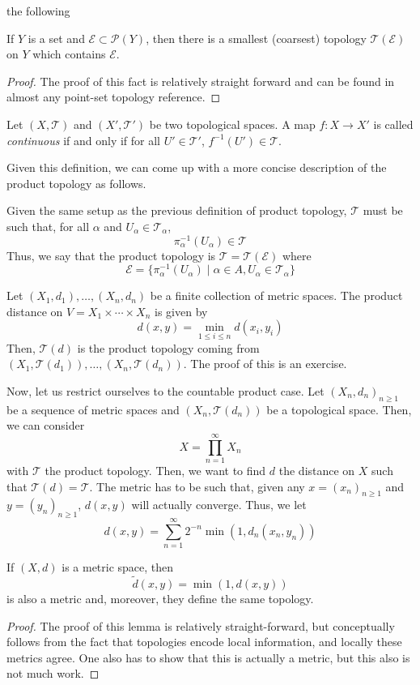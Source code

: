 \documentclass[11pt,leqno,oneside]{amsbook}
\numberwithin{thm}{section}
\renewcommand{\P}{\mathcal{P}}
\newcommand{\Ep}{\mathcal{E}}
\newcommand{\Top}{\mathcal{T}} %
\begin{document}
the following
\begin{prop}
  If $Y$ is a set and $\Ep \subset \P(Y)$, then there is a smallest (coarsest)
topology $\Top(\Ep)$ on $Y$ which contains $\Ep$.
\end{prop}
\begin{proof}
  The proof of this fact is relatively straight forward and can be
  found in almost any point-set topology reference.
\end{proof}
\begin{defn}
  Let $(X,\Top)$ and $(X',\Top')$ be two topological spaces. A map $f\colon
  X \to X'$ is called \emph{continuous} if and only if for all $U' \in
  \Top'$, $f^{-1}(U') \in \Top$.
\end{defn}
Given this definition, we can come up with a more concise description
of the product topology as follows.
\begin{defn}
  Given the same setup as the previous definition of product topology,
  $\Top$ must be such that, for all $\alpha$ and $U_\alpha \in
  \Top_\alpha$, \[
    \pi_\alpha^{-1}(U_\alpha) \in \Top
  \]
  Thus, we say that the product topology is $\Top = \Top(\Ep)$
  where \[
    \Ep = \{\pi_{\alpha}^{-1}(U_\alpha) \mid \alpha \in A, U_\alpha
    \in \Top_\alpha\}
  \]
\end{defn}
\begin{rmk}
  Let $(X_1,d_1), \ldots, (X_n,d_n)$ be a finite collection of metric
  spaces. The product distance on $V = X_1 \times \cdots \times X_n$
  is given by \[
    d(x,y) = \min_{1 \leq i \leq n} d(x_i,y_i)
  \]
  Then, $\Top(d)$ is the product topology coming from
  $(X_1,\Top(d_1)), \ldots, (X_n,\Top(d_n))$. The proof of this is an
  exercise.
\end{rmk}
Now, let us restrict ourselves to the countable product case. Let
$(X_n,d_n)_{n \geq 1}$ be a sequence of metric spaces and
$(X_n,\Top(d_n))$ be a topological space. Then, we can consider \[
  X = \prod_{n=1}^\infty X_n
\]
with $\Top$ the product topology. Then, we want to find $d$ the
distance on $X$ such that $\Top(d) = \Top$. The metric has to be such
that, given any $x = (x_n)_{n \geq 1}$ and $y = (y_n)_{n \geq 1}$,
$d(x,y)$ will actually converge. Thus, we let \[
  d(x,y) = \sum_{n=1}^\infty 2^{-n} \min(1,d_n(x_n,y_n))
\]
\begin{lem}
  If $(X,d)$ is a metric space, then \[
    \tilde{d}(x,y) = \min(1,d(x,y))
  \]
  is also a metric and, moreover, they define the same topology.
\end{lem}
\begin{proof}
  The proof of this lemma is relatively straight-forward, but
  conceptually follows from the fact that topologies encode local
  information, and locally these metrics agree. One also has to show
  that this is actually a metric, but this also is not much work.
\end{proof}
\end{document}
